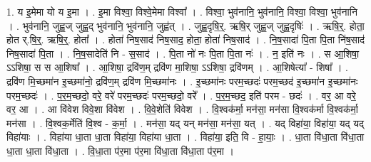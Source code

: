 \documentclass[17pt]{extarticle}
\begin{document}
1. य इ॒मेमा यो य इ॒मा । . इ॒मा विश्वा॒ विश्वे॒मेमा विश्वा᳚ । . विश्वा॒ भुव॑नानि॒ भुव॑नानि॒ विश्वा॒ विश्वा॒ भुव॑नानि । . भुव॑नानि॒ जुह्व॒ज् जुह्व॒द् भुव॑नानि॒ भुव॑नानि॒ जुह्व॑त् । . जुह्व॒दृषि॒र्॒. ऋषि॒र् जुह्व॒ज् जुह्व॒दृषिः॑ । . ऋषि॒र्॒. होता॒ होत र्.षि॒र्॒. ऋषि॒र्॒. होता᳚ । . होता॑ निष॒साद॑ निष॒साद॒ होता॒ होता॑ निष॒साद॑ । . नि॒ष॒सादा॑ पि॒ता पि॒ता नि॑ष॒साद॑ निष॒सादा॑ पि॒ता । . नि॒ष॒सादेति॑ नि - स॒साद॑ । . पि॒ता नो॑ नः पि॒ता पि॒ता नः॑ । . न॒ इति॑ नः । . स आ॒शिषा॒ ऽऽशिषा॒ स स आ॒शिषा᳚ । . आ॒शिषा॒ द्रवि॑ण॒म् द्रवि॑ण मा॒शिषा॒ ऽऽशिषा॒ द्रवि॑णम् । . आ॒शिषेत्या᳚ - शिषा᳚ । . द्रवि॑ण मि॒च्छमा॑न इ॒च्छमा॑नो॒ द्रवि॑ण॒म् द्रवि॑ण मि॒च्छमा॑नः । . इ॒च्छमा॑नः परम॒च्छदः॑ परम॒च्छद॑ इ॒च्छमा॑न इ॒च्छमा॑नः परम॒च्छदः॑ । . प॒र॒म॒च्छदो॒ वरे॒ वरे॑ परम॒च्छदः॑ परम॒च्छदो॒ वरे᳚ । . प॒र॒म॒च्छद॒ इति॑ परम - छदः॑ । . वर॒ आ वरे॒ वर॒ आ । . आ वि॑वेश विवे॒शा वि॑वेश । . वि॒वे॒शेति॑ विवेश । . वि॒श्वक॑र्मा॒ मन॑सा॒ मन॑सा वि॒श्वक॑र्मा वि॒श्वक॑र्मा॒ मन॑सा । . वि॒श्वक॒र्मेति॑ वि॒श्व - क॒र्मा॒ । . मन॑सा॒ यद् यन् मन॑सा॒ मन॑सा॒ यत् । . यद् विहा॑या॒ विहा॑या॒ यद् यद् विहा॑याः । . विहा॑या धा॒ता धा॒ता विहा॑या॒ विहा॑या धा॒ता । . विहा॑या॒ इति॒ वि - हा॒याः॒ । . धा॒ता वि॑धा॒ता वि॑धा॒ता धा॒ता धा॒ता वि॑धा॒ता । . वि॒धा॒ता प॑र॒मा प॑र॒मा वि॑धा॒ता वि॑धा॒ता प॑र॒मा । \newline
\end{document}

